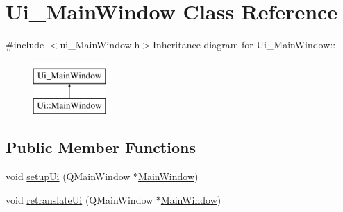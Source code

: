 \hypertarget{classUi__MainWindow}{
\section{Ui\_\-MainWindow Class Reference}
\label{classUi__MainWindow}
}


{\ttfamily \#include $<$ui\_\-MainWindow.h$>$}Inheritance diagram for Ui\_\-MainWindow::\begin{figure}[H]
\begin{center}
\leavevmode
\includegraphics[height=2cm]{classUi__MainWindow}
\end{center}
\end{figure}
\subsection*{Public Member Functions}
\begin{DoxyCompactItemize}
\item 
void \hyperlink{classUi__MainWindow_acf4a0872c4c77d8f43a2ec66ed849b58}{setupUi} (QMainWindow $\ast$\hyperlink{classMainWindow}{MainWindow})
\item 
void \hyperlink{classUi__MainWindow_a097dd160c3534a204904cb374412c618}{retranslateUi} (QMainWindow $\ast$\hyperlink{classMainWindow}{MainWindow})
\end{DoxyCompactItemize}
